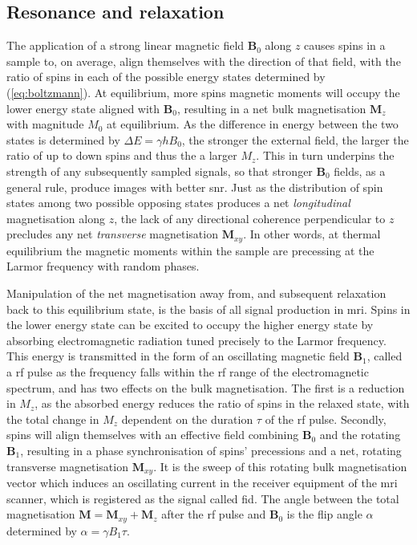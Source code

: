\subsection{Resonance and relaxation}

%
%

The application of a strong linear magnetic field $\mathbf{B}_0$ along $z$ causes spins in a sample to, on average, align themselves with the direction of that field, with the ratio of spins in each of the possible energy states determined by (\ref{eq:boltzmann}).
At equilibrium, more spins magnetic moments will occupy the lower energy state aligned with $\mathbf{B}_0$, resulting in a net bulk magnetisation $\mathbf{M}_z$ with magnitude $M_0$ at equilibrium.
As the difference in energy between the two states is determined by $\Delta E = \gamma h B_0$, the stronger the external field, the larger the ratio of up to down spins and thus the a larger $M_z$.
This in turn underpins the strength of any subsequently sampled signals, so that stronger $\mathbf{B}_0$ fields, as a general rule, produce images with better \gls{snr}.
Just as the distribution of spin states among two possible opposing states produces a net \textit{longitudinal} magnetisation along $z$, the lack of any directional coherence perpendicular to $z$ precludes any net \textit{transverse} magnetisation $\mathbf{M}_{xy}$.
In other words, at thermal equilibrium the magnetic moments within the sample are precessing at the Larmor frequency with random phases.

Manipulation of the net magnetisation away from, and subsequent relaxation back to this equilibrium state, is the basis of all signal production in \gls{mri}.
Spins in the lower energy state can be excited to occupy the higher energy state by absorbing electromagnetic radiation tuned precisely to the Larmor frequency.
This energy is transmitted in the form of an oscillating magnetic field $\mathbf{B}_1$, called a \gls{rf} pulse as the frequency falls within the \gls{rf} range of the electromagnetic spectrum, and has two effects on the bulk magnetisation.
The first is a reduction in $M_z$, as the absorbed energy reduces the ratio of spins in the relaxed state, with the total change in $M_z$ dependent on the duration $\tau$ of the \gls{rf} pulse.
Secondly, spins will align themselves with an effective field combining $\mathbf{B}_0$ and the rotating $\mathbf{B}_1$, resulting in a phase synchronisation of spins' precessions and a net, rotating transverse magnetisation $\mathbf{M}_{xy}$.
It is the sweep of this rotating bulk magnetisation vector which induces an oscillating current in the receiver equipment of the \gls{mri} scanner, which is registered as the signal called \gls{fid}.
The angle between the total magnetisation $\mathbf{M} = \mathbf{M}_{xy} + \mathbf{M}_{z}$ after the \gls{rf} pulse and $\mathbf{B}_0$ is the flip angle $\alpha$ determined by $\alpha = \gamma B_1 \tau$.

